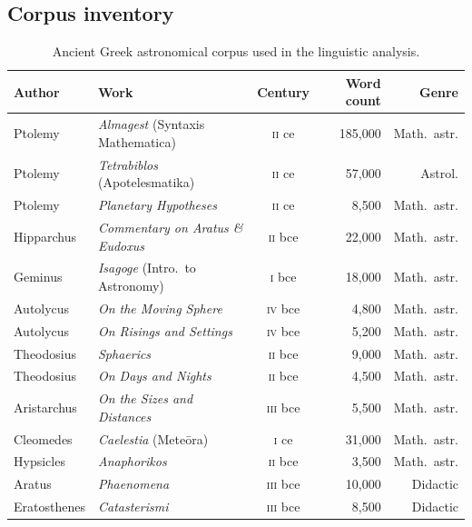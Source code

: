 \documentclass[11pt,a4paper]{article}
\begin{document}
\subsection{Corpus inventory}

\begin{table}[h]
\caption{Ancient Greek astronomical corpus used in the linguistic
  analysis.}\label{tab:corpus}
\centering
\small
\begin{tabular}{@{}lp{5cm}crr@{}}
\toprule
Author & Work & Century & Word count & Genre \\
\midrule
Ptolemy          & \textit{Almagest} (Syntaxis Mathematica)    & \textsc{ii} ce  & 185,000 & Math.~astr. \\
Ptolemy          & \textit{Tetrabiblos} (Apotelesmatika)       & \textsc{ii} ce  &  57,000 & Astrol. \\
Ptolemy          & \textit{Planetary Hypotheses}               & \textsc{ii} ce  &   8,500 & Math.~astr. \\
Hipparchus       & \textit{Commentary on Aratus \& Eudoxus}   & \textsc{ii} bce &  22,000 & Math.~astr. \\
Geminus          & \textit{Isagoge} (Intro.\ to Astronomy)    & \textsc{i} bce  &  18,000 & Math.~astr. \\
Autolycus        & \textit{On the Moving Sphere}               & \textsc{iv} bce &   4,800 & Math.~astr. \\
Autolycus        & \textit{On Risings and Settings}            & \textsc{iv} bce &   5,200 & Math.~astr. \\
Theodosius       & \textit{Sphaerics}                          & \textsc{ii} bce &   9,000 & Math.~astr. \\
Theodosius       & \textit{On Days and Nights}                 & \textsc{ii} bce &   4,500 & Math.~astr. \\
Aristarchus      & \textit{On the Sizes and Distances}         & \textsc{iii} bce&   5,500 & Math.~astr. \\
Cleomedes        & \textit{Caelestia} (Mete\={o}ra)           & \textsc{i} ce   &  31,000 & Math.~astr. \\
Hypsicles        & \textit{Anaphorikos}                        & \textsc{ii} bce &   3,500 & Math.~astr. \\
Aratus           & \textit{Phaenomena}                         & \textsc{iii} bce&  10,000 & Didactic \\
Eratosthenes     & \textit{Catasterismi}                       & \textsc{iii} bce&   8,500 & Didactic \\

\end{tabular}
\end{table}
\end{document}
